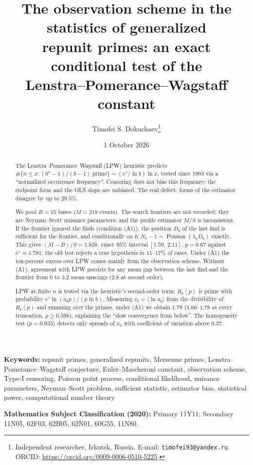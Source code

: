 \documentclass[11pt,a4paper]{article}
\title{The observation scheme in the statistics of generalized\\
repunit primes: an exact conditional test of the\\
Lenstra--Pomerance--Wagstaff constant}
\author{Timofei S. Dokuchaev\thanks{Independent researcher, Irkutsk, Russia.
E-mail: \texttt{timofei93@yandex.ru}. ORCID:
\url{https://orcid.org/0009-0006-0510-5225}.}}
\date{1 October 2026}
\theoremstyle{plain}
\theoremstyle{remark}
\DeclareMathOperator{\Pois}{Poisson}
\begin{document}
\maketitle

\begin{abstract}
\noindent The Lenstra--Pomerance--Wagstaff (LPW) heuristic predicts
$\#\{n\le x: (b^n-1)/(b-1)\ \text{prime}\}\sim(e^{\gamma}/\ln b)\ln x$, tested
since 1993 via a ``normalized occurrence frequency''. Censoring does
not bias this frequency: the endpoint form and the OLS
slope are unbiased. The real defect: forms of the estimator disagree by up to
$29.5\%$.

We pool $B=15$ bases ($M=218$ events). The search frontiers are not
recorded; they are Neyman--Scott nuisance parameters, and the profile estimator
$M/S$ is inconsistent. If the frontier ignored the finds
(condition (A1)), the position $D_b$ of the last find is sufficient for the
frontier, and conditionally on it $N_b-1\sim\Pois(\lambda_bD_b)$ exactly. This
gives $(M-B)/S=1.838$, exact $95\%$ interval $[1.59,\,2.11]$, $p=0.67$ against
$e^{\gamma}\approx1.781$; the old test rejects a true hypothesis in $11$--$17\%$
of cases. Under (A1) the ten-percent excess over LPW comes mainly from the
observation scheme. Without (A1), agreement with LPW persists for any mean gap between the last find
and the frontier from $0$ to $3.2$ mean spacings ($2.8$ at second
order).

LPW at finite $n$ is tested via the heuristic's second-order term:
$R_b(p)$ is prime with probability $e^{\gamma}\ln(a_bp)/(p\ln b)$. Measuring
$c_b=\langle\ln a_b\rangle$ from the divisibility of $R_b(p)$ and
summing over the primes, under (A1) we obtain $1.78$ ($1.66$--$1.78$ at every truncation,
$p\ge0.598$), explaining the ``slow convergence from below''. The
homogeneity test ($p=0.935$) detects only spreads of $\kappa_b$ with coefficient
of variation above $0.37$.
\end{abstract}

\medskip
\noindent\textbf{Keywords:} repunit primes, generalized repunits, Mersenne
primes, Lenstra--Pomerance--Wagstaff conjecture, Euler--Mascheroni constant,
observation scheme, Type-I censoring, Poisson point process,
conditional likelihood, nuisance parameters, Neyman--Scott problem, sufficient
statistic, estimator bias, statistical power, computational number theory

\medskip
\noindent\textbf{Mathematics Subject Classification (2020):}
Primary 11Y11; Secondary 11N05, 62F03, 62B05, 62N01, 60G55, 11N80.
\end{document}
